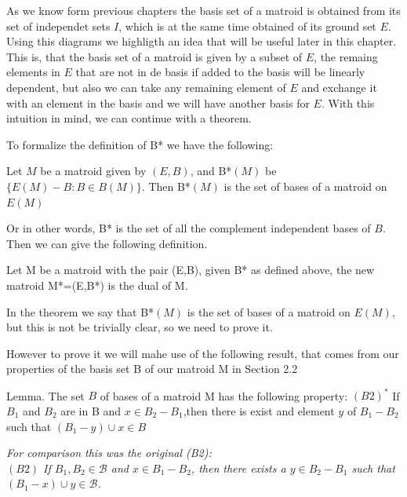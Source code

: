 \begin{center}
\end{center}




As we know form previous chapters the basis set of a matroid is obtained from its set of independet sets $I$, which is at the same time obtained of its ground set $E$.
Using this diagrams we highligth an idea that will be useful later in this chapter.
This is, that the basis set of a matroid is given by a subset of $E$, the remaing elements in $E$ that are not in de basis if added to the basis will be linearly dependent, but also we can take any remaining element of $E$ and exchange it with an element in the basis and we will have another basis for $E$. With this intuition in mind, we can continue with a theorem.


To formalize the definition of B* we have the following:
\begin{theorem}
    Let $M$ be a matroid given by $(E,B)$, and B*$(M)$ be $\{E(M) - B:B\in B(M)\}$. Then B*$(M)$ is the set of bases of a matroid on $E(M)$
\end{theorem}

Or in other words, B* is the set of all the complement independent bases of $B$. Then we can give the following definition.

\begin{defn}
    Let M be a matroid with the pair (E,B), given B* as defined above, the new matroid M*=(E,B*) is the dual of M.
\end{defn}

In the theorem we say that B*$(M)$ is the set of bases of a matroid on $E(M)$, but this is not be trivially clear, so we need to prove it.

However to prove it we will mahe use of the following result, that comes from our properties of the basis set B of our matroid M in Section 2.2

Lemma. The set $B$ of bases of a matroid M has the following property:
$(B2)^*$ If $B_1$ and $B_2$ are in B and $x \in B_2 - B_1$,then there is exist and element $y$ of $B_1 - B_2$ such that $(B_1 - y) \cup x \in B$

\textit{For comparison this was the original (B2): \\
$(B2)$ If $B_1,B_2\in\mathcal{B}$ and $x\in B_1 - B_2$, then there exists a $y\in B_2 - B_1$ such that $(B_1 - x)\cup y \in\mathcal{B}$.}\\

